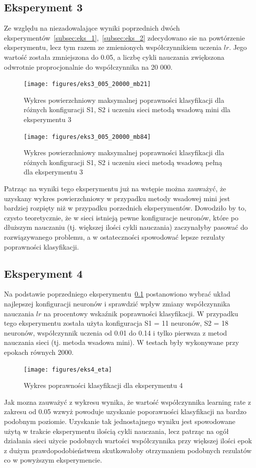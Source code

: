 \documentclass[12pt,twoside]{article}
\begin{document}
\subsection{Eksperyment 3} \label{subsec:eks_3}
Ze względu na niezadowalające wyniki poprzednich dwóch eksperymentów~\ref{subsec:eks_1},~\ref{subsec:eks_2} zdecydowano sie na powtórzenie eksperymentu, lecz tym razem ze zmienionych współczynnikiem uczenia $lr$. Jego wartość została zmniejszona do 0.05, a liczbę cykli nauczania zwiększona odwrotnie proprocjonalnie do współczynnika na 20 000.
\begin{figure}[ht!]
	\centering
	\texttt{[image: figures/eks3\_005\_20000\_mb21]}
	\caption{Wykres powierzchniowy maksymalnej poprawności klasyfikacji dla różnych konfiguracji S1, S2 i uczeniu sieci metodą wsadową mini dla eksperymentu 3}
	\label{Fig:eks3_005_20000_mb21}
\end{figure}
\begin{figure}[ht!]
	\centering
	\texttt{[image: figures/eks3\_005\_20000\_mb84]}
	\caption{Wykres powierzchniowy maksymalnej poprawności klasyfikacji dla różnych konfiguracji S1, S2 i uczeniu sieci metodą wsadową pełną dla eksperymentu 3}
	\label{Fig:eks3_005_20000_mb84}
\end{figure}

Patrząc na wyniki tego eksperymentu już na wstępie można zauważyć, że uzyskany wykres powierzchniowy w przypadku metody wsadowej mini jest bardziej rozpięty niż w przypadku porzednich eksperymentów. Dowodziło by to, czysto teoretycznie, że w sieci istnieją pewne konfiguracje neuronów, które po dłuższym nauczaniu (tj. większej ilości cykli nauczania) zaczynałyby pasować do rozwiązywanego problemu, a w ostateczności spowodować lepsze rezulaty poprawności klasyfikacji.

\newpage
\subsection{Eksperyment 4} \label{subsec:eks_4}
Na podstawie poprzedniego eksperymentu~\ref{subsec:eks_3} postanowiono wybrać układ najlepszej konfiguracji neuronów i sprawdzić wpływ zmiany współczynnika nauczania $lr$ na procentowy wskaźnik poprawności klasyfikacji. W przypadku tego eksperymentu została użyta konfiguracja S1 = 11 neuronów, S2 = 18 neuronów, współczynnik uczenia od 0.01 do 0.14 i tylko pierwsza z metod nauczania sieci (tj. metoda wsadowa mini). W testach były wykonywane przy epokach równych 2000.
\begin{figure}[ht!]
	\centering
	\texttt{[image: figures/eks4\_eta]}
	\caption{Wykres poprawności klasyfikacji dla eksperymentu 4}
	\label{Fig:eks4_eta}
\end{figure}
Jak mozna zauważyć z wykresu wynika, że wartość współczynnika learning rate z zakresu od 0.05 wzwyż powoduje uzyskanie poporawności klasyfikacji na bardzo podobnym poziomie. Uzyskanie tak jednostajnego wyniku jest spowodowane użytą w trakcie eksperymentu ilością cykli nauczania, lecz patrząc na ogół działania sieci użycie podobnych wartości współczynnika przy większej ilości epok z dużym prawdopodobieństwem skutkowałoby otrzymaniem podobnych rezulatów co w powyższym eksperymencie.
\end{document}
